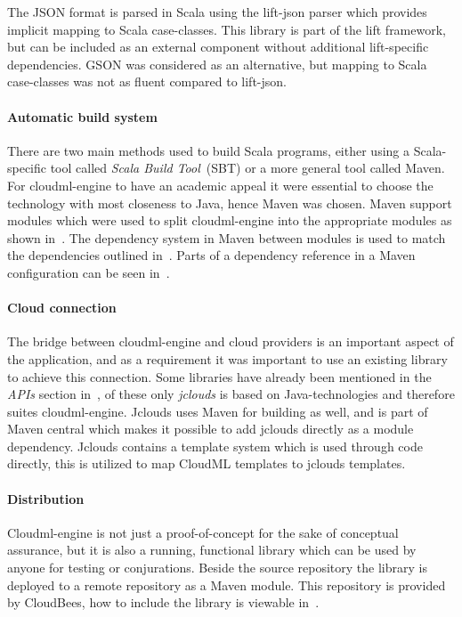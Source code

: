 The JSON format is parsed in Scala using the lift-json parser which provides implicit
mapping to Scala case-classes. This library is part of the lift framework,
but can be included as an external component without additional lift-specific dependencies.
GSON was considered as an alternative, but mapping to Scala case-classes was not as 
fluent compared to lift-json.

\paragraph{Automatic build system}
There are two main methods used to build Scala programs, either using a Scala-specific tool called 
\emph{Scala Build Tool}~(SBT) or a more general tool called Maven. 
For cloudml-engine to have an academic appeal it were essential to choose the technology
with most closeness to Java, hence Maven was chosen.
Maven support modules which were used to split cloudml-engine into the appropriate 
modules as shown in~. 
The dependency system in Maven between modules is used to match the dependencies outlined in~.
Parts of a dependency reference in a Maven configuration can be seen in~.

\paragraph{Cloud connection}
The bridge between cloudml-engine and cloud providers is an important aspect of the application, and as a requirement
it was important to use an existing library to achieve this connection.
Some libraries have already been mentioned in the \emph{APIs} section in~,
of these only \emph{jclouds} is based on Java-technologies and therefore suites cloudml-engine.
Jclouds uses Maven for building as well, and is part of Maven central which makes 
it possible to add jclouds directly as a module dependency.
Jclouds contains a template system which is used through code directly, this is utilized 
to map CloudML templates to jclouds templates.

\paragraph{Distribution}
Cloudml-engine is not just a proof-of-concept for the sake of conceptual assurance, but it is 
also a running, functional library which can be used by anyone for testing or conjurations.
Beside the source repository\cite{cloudml-engine} the library is deployed to a remote repository
\cite{cloudbees-cloudml-engine} as a Maven module.
This repository is provided by CloudBees, 
how to include the library is viewable in~.


